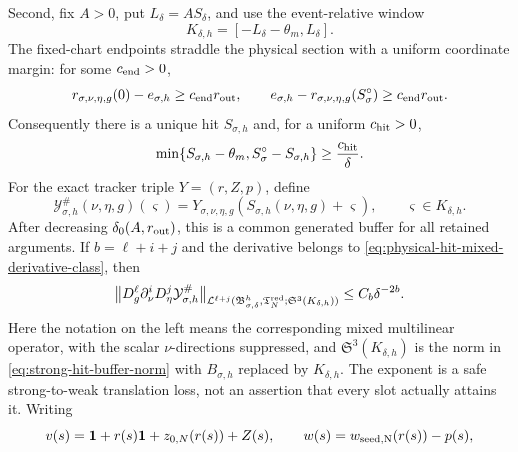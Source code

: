 \begin{proposition}
Second, fix $A>0$, put $L_\delta=AS_\delta$, and use the event-relative
window
\begin{equation}
 K_{\delta,h}=[-L_\delta-\theta_m,L_\delta].       \label{eq:parameter-coherent-event-window}
\end{equation}
The fixed-chart endpoints straddle the physical section with a uniform
coordinate margin: for some $c_{\rm end}>0$,
\begin{equation}
 r_{\sigma,\nu,\eta,g}(0)-e_{\sigma,h}
       \ge c_{\rm end}r_{\rm out},
 \qquad
 e_{\sigma,h}-r_{\sigma,\nu,\eta,g}(S_\sigma^\circ)
       \ge c_{\rm end}r_{\rm out}.              \label{eq:parameter-coherent-endpoint-gap}
\end{equation}
Consequently there is a unique hit $S_{\sigma,h}$ and, for a uniform
$c_{\rm hit}>0$,
\begin{equation}
 \min\{S_{\sigma,h}-\theta_m,
            S_\sigma^\circ-S_{\sigma,h}\}
 \ge \frac{c_{\rm hit}}{\delta}.                \label{eq:parameter-coherent-hit-margin}
\end{equation}
For the exact tracker triple $Y=(r,Z,p)$, define
\begin{equation}
 \mathcal Y_{\sigma,h}^{\#}(\nu,\eta,g)(\varsigma)
 =Y_{\sigma,\nu,\eta,g}
    (S_{\sigma,h}(\nu,\eta,g)+\varsigma),
 \qquad \varsigma\in K_{\delta,h}.              \label{eq:parameter-coherent-event-buffer}
\end{equation}
After decreasing \(\delta_0(A,r_{\rm out})\), this is a common generated
buffer for all retained arguments.  If
\(b=\ell+i+j\) and the derivative belongs to
\cref{eq:physical-hit-mixed-derivative-class}, then
\begin{equation}
 \bigl\|D_g^\ell\partial_\nu^iD_\eta^j
     \mathcal Y_{\sigma,h}^{\#}\bigr\|_{
     \mathcal L^{\ell+j}(\mathfrak B_{\sigma,\delta}^h,
       \mathfrak T_N^{\rm red};\mathfrak S^3(K_{\delta,h}))}
 \le C_b\delta^{-2b}.                            \label{eq:parameter-coherent-event-buffer-jets}
\end{equation}
Here the notation on the left means the corresponding mixed multilinear
operator, with the scalar \(\nu\)-directions suppressed, and
$\mathfrak S^3(K_{\delta,h})$ is the norm in
\cref{eq:strong-hit-buffer-norm} with $B_{\sigma,h}$ replaced by
$K_{\delta,h}$.  The exponent is a safe strong-to-weak translation loss,
not an assertion that every slot actually attains it.  Writing
\begin{equation}
 v(s)=\mathbf1+r(s)\mathbf1+z_{0,N}(r(s))+Z(s),
 \qquad w(s)=w_{\rm seed,N}(r(s))-p(s),           \label{eq:parameter-coherent-physical-reconstruction}

\end{equation}
\end{proposition}
